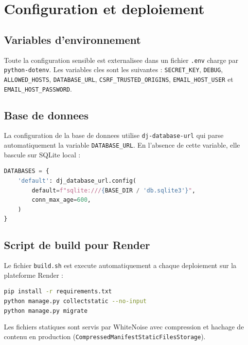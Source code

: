 \documentclass[12pt,a4paper]{report}
\newcommand{\fichier}[1]{\texttt{#1}}
\newcommand{\var}[1]{\texttt{#1}}
\begin{document}
\section{Configuration et deploiement}

\subsection{Variables d'environnement}

Toute la configuration sensible est externalisee dans un fichier \fichier{.env}
charge par \texttt{python-dotenv}. Les variables cles sont les suivantes :
\var{SECRET\_KEY}, \var{DEBUG}, \var{ALLOWED\_HOSTS}, \var{DATABASE\_URL},
\var{CSRF\_TRUSTED\_ORIGINS}, \var{EMAIL\_HOST\_USER} et
\var{EMAIL\_HOST\_PASSWORD}.

\subsection{Base de donnees}

La configuration de la base de donnees utilise \texttt{dj-database-url} qui
parse automatiquement la variable \var{DATABASE\_URL}. En l'absence de cette
variable, elle bascule sur SQLite local :

\begin{lstlisting}[language=Python,caption={Configuration de la base de donnees}]
DATABASES = {
    'default': dj_database_url.config(
        default=f"sqlite:///{BASE_DIR / 'db.sqlite3'}",
        conn_max_age=600,
    )
}
\end{lstlisting}

\subsection{Script de build pour Render}

Le fichier \fichier{build.sh} est execute automatiquement a chaque deploiement
sur la plateforme Render :

\begin{lstlisting}[language=bash,caption={Script de build}]
pip install -r requirements.txt
python manage.py collectstatic --no-input
python manage.py migrate
\end{lstlisting}

Les fichiers statiques sont servis par WhiteNoise avec compression et hachage
de contenu en production (\texttt{CompressedManifestStaticFilesStorage}).

\end{document}
